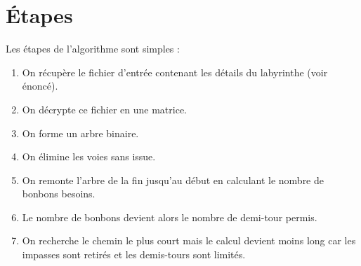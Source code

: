 \section{Étapes}

Les étapes de l'algorithme sont simples :
\begin{enumerate}
	\item On récupère le fichier d'entrée contenant les détails du labyrinthe (voir énoncé).
    \item On décrypte ce fichier en une matrice.
    \item On forme un arbre binaire.
    \item On élimine les voies sans issue.
    \item On remonte l'arbre de la fin jusqu'au début en calculant le nombre de bonbons besoins.
    \item Le nombre de bonbons devient alors le nombre de demi-tour permis.
    \item On recherche le chemin le plus court mais le calcul devient moins long car les impasses sont retirés et les demis-tours sont limités.
\end{enumerate}
